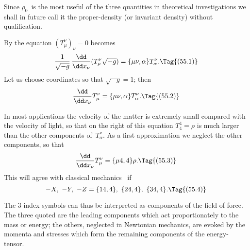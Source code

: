 \documentclass[12pt]{book}
\begin{document}
Since $\rho_{0}$~is the most useful of the three quantities in theoretical investigations
we shall in future call it the proper\hyp{}density (or invariant density)
without qualification.

%

By  the equation $(T_{\mu}^{\nu})_{\nu} = 0$ becomes
\[
\frac{1}{\sqrt{-g}}\, \frac{\dd}{\dd x_{\nu}}(T_{\mu}^{\nu} \sqrt{-g})
= \{\mu\nu, \alpha\} T_{\alpha}^{\nu}.
\Tag{(55.1)}
\]
Let us choose coordinates so that $\sqrt{-g} = 1$; then
\[
\frac{\dd}{\dd x_{\nu}}T_{\mu}^{\nu} = \{\mu\nu, \alpha\} T_{\alpha}^{\nu}.
\Tag{(55.2)}
\]

In most applications the velocity of the matter is extremely small compared
with the velocity of light, so that on the right of this equation $T_{4}^{4} = \rho$ is
much larger than the other components of~$T_{\alpha}^{\nu}$. As a first approximation we
neglect the other components, so that
\[
\frac{\dd}{\dd x_{\nu}} T_{\mu}^{\nu} = \{\mu4, 4\} \rho.
\Tag{(55.3)}
\]
This will agree with classical mechanics~ if
\[
-X,\ -Y,\ -Z = \{14, 4\},\ \{24, 4\},\ \{34, 4\}.
\Tag{(55.4)}
\]

The $3$-index symbols can thus be interpreted as components of the field
of force. The three quoted are the leading components which act proportionately
to the mass or energy; the others, neglected in Newtonian mechanics,
are evoked by the momenta and stresses which form the remaining components
of the energy\hyp{}tensor.
\end{document}
